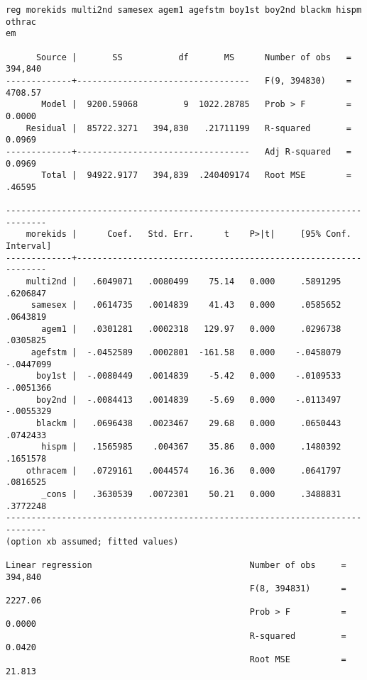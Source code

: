 \documentclass[cache=false]{article}
\begin{document}
\begin{verbatim}
reg morekids multi2nd samesex agem1 agefstm boy1st boy2nd blackm hispm othrac
em

      Source |       SS           df       MS      Number of obs   =   394,840
-------------+----------------------------------   F(9, 394830)    =   4708.57
       Model |  9200.59068         9  1022.28785   Prob > F        =    0.0000
    Residual |  85722.3271   394,830   .21711199   R-squared       =    0.0969
-------------+----------------------------------   Adj R-squared   =    0.0969
       Total |  94922.9177   394,839  .240409174   Root MSE        =    .46595

------------------------------------------------------------------------------
    morekids |      Coef.   Std. Err.      t    P>|t|     [95% Conf. Interval]
-------------+----------------------------------------------------------------
    multi2nd |   .6049071   .0080499    75.14   0.000     .5891295    .6206847
     samesex |   .0614735   .0014839    41.43   0.000     .0585652    .0643819
       agem1 |   .0301281   .0002318   129.97   0.000     .0296738    .0305825
     agefstm |  -.0452589   .0002801  -161.58   0.000    -.0458079   -.0447099
      boy1st |  -.0080449   .0014839    -5.42   0.000    -.0109533   -.0051366
      boy2nd |  -.0084413   .0014839    -5.69   0.000    -.0113497   -.0055329
      blackm |   .0696438   .0023467    29.68   0.000     .0650443    .0742433
       hispm |   .1565985    .004367    35.86   0.000     .1480392    .1651578
    othracem |   .0729161   .0044574    16.36   0.000     .0641797    .0816525
       _cons |   .3630539   .0072301    50.21   0.000     .3488831    .3772248
------------------------------------------------------------------------------
(option xb assumed; fitted values)

Linear regression                               Number of obs     =    394,840
                                                F(8, 394831)      =    2227.06
                                                Prob > F          =     0.0000
                                                R-squared         =     0.0420
                                                Root MSE          =     21.813


\end{verbatim}
\end{document}
